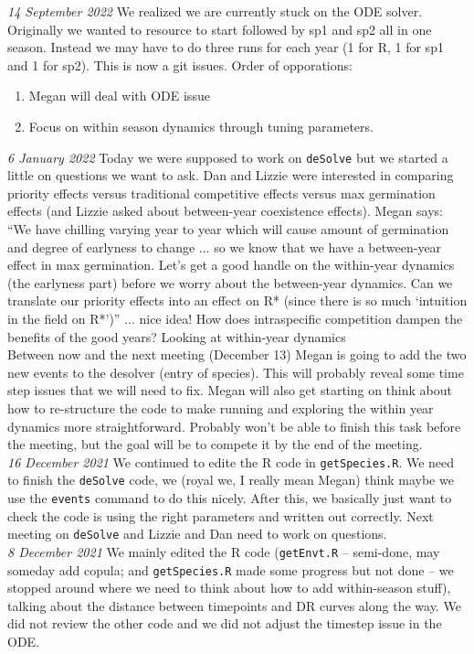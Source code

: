 \documentclass[11pt,letter]{article}
\begin{document}
\emph{14 September 2022}
We realized we are currently stuck on the ODE solver. Originally we wanted to resource to start followed by sp1 and sp2 all in one season. Instead we may have to do three runs for each year (1 for R, 1 for sp1 and 1 for sp2). This is now a git issues. Order of opporations:
\begin{enumerate}
\item Megan will deal with ODE issue
\item Focus on within season dynamics through tuning parameters.
\end{enumerate}
\emph{6 January 2022} Today we were supposed to work on \verb|deSolve| but we started a little on questions we want to ask. Dan and Lizzie were interested in comparing priority effects versus traditional competitive effects versus max germination effects (and Lizzie asked about between-year coexistence effects). Megan says: ``We have chilling varying year to year which will cause amount of germination and degree of earlyness to change ... so we know that we have a between-year effect in max germination. Let's get a good handle on the within-year dynamics (the earlyness part) before we worry about the between-year dynamics. Can we translate our priority effects into an effect on R* (since there is so much `intuition in the field on R*')'' ... nice idea! How does intraspecific competition dampen the benefits of the good years? Looking at within-year dynamics \\

Between now and the next meeting (December 13) Megan is going to add the two new events to the desolver (entry of species). This will probably reveal some time step issues that we will need to fix. Megan will also get starting on think about how to re-structure the code to make running and exploring the within year dynamics more straightforward. Probably won't be able to finish this task before the meeting, but the goal will be to compete it by the end of the meeting.\\

\emph{16 December 2021} We continued to edite the R code in \verb|getSpecies.R|. We need to finish the \verb|deSolve| code, we (royal we, I really mean Megan) think maybe we use the \verb|events| command to do this nicely. After this, we basically just want to check the code is using the right parameters and written out correctly. Next meeting on \verb|deSolve| and Lizzie and Dan need to work on questions.\\

\emph{8 December 2021} We mainly edited the R code (\verb|getEnvt.R| -- semi-done, may someday add copula; and \verb|getSpecies.R| made some progress but not done -- we stopped around where we need to think about how to add within-season stuff), talking about the distance between timepoints and DR curves along the way. We did not review the other code and we did not adjust the timestep issue in the ODE. \\
\end{document}
